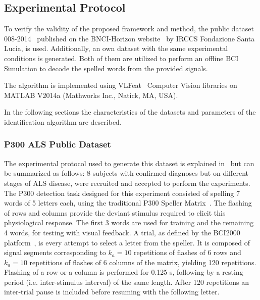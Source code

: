 \documentclass[entropy,article,submit,moreauthors,pdftex,10pt,a4paper]{mdpi}
\begin{document}



\subsection{Experimental Protocol} \label{Protocol}

To verify the validity of the proposed framework and method, the public dataset 008-2014~\citep{Riccio2013} published on the BNCI-Horizon website~\citep{Brunner2014} by  IRCCS Fondazione Santa Lucia, is used. Additionally, an own dataset with  the same experimental conditions is generated. Both of them are utilized to perform an offline BCI Simulation to decode the spelled words from the provided signals. 

The algorithm is implemented using  VLFeat~\citep{Vedaldi2010} Computer Vision libraries on MATLAB V2014a (Mathworks Inc., Natick, MA, USA). 

In the following sections the characteristics of the datasets and parameters of the identification algorithm are described. 

\subsubsection{P300 ALS Public Dataset} \label{ALSDataset}

The experimental protocol used to generate this dataset is explained in~\citep{Riccio2013} but can be summarized as follows:  8 subjects with confirmed diagnoses but on different stages of ALS disease, were recruited and accepted to perform the experiments. The P300 detection task designed for this experiment consisted of spelling 7 words of 5 letters each, using the traditional P300 Speller Matrix~\citep{Farwell1988}. The flashing of rows and columns provide the deviant stimulus required to elicit this physiological response.  The first 3 words are used for training and the remaining 4 words, for testing with visual feedback.  A trial, as defined by the BCI2000 platform~\citep{Schalk2004}, is every attempt to select a letter from the speller. It is composed of signal segments corresponding to $k_a =10$ repetitions of flashes of 6 rows and $k_a =10$ repetitions of flashes of 6 columns of the matrix, yielding 120 repetitions.  Flashing of a row or a column is performed for 0.125 s, following by a resting period (i.e. inter-stimulus interval) of the same length.  After 120 repetitions an inter-trial pause is included before resuming with the following letter.
\end{document}
